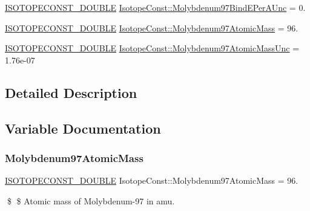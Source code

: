 \begin{DoxyCompactItemize}
\mbox{\hyperlink{group___isotope_const-_macros_ga8f45a7272ce02c0b4c65c44636ed719a}{I\+S\+O\+T\+O\+P\+E\+C\+O\+N\+S\+T\+\_\+\+D\+O\+U\+B\+LE}} \mbox{\hyperlink{group___isotope_const-_molybdenum-_mo97_gaccb187e931632cf61d34bbdfd971112c}{Isotope\+Const\+::\+Molybdenum97\+Bind\+E\+Per\+A\+Unc}} = 0.
\item 
\mbox{\hyperlink{group___isotope_const-_macros_ga8f45a7272ce02c0b4c65c44636ed719a}{I\+S\+O\+T\+O\+P\+E\+C\+O\+N\+S\+T\+\_\+\+D\+O\+U\+B\+LE}} \mbox{\hyperlink{group___isotope_const-_molybdenum-_mo97_ga2da184bc583d3535cd91ca4720f8041b}{Isotope\+Const\+::\+Molybdenum97\+Atomic\+Mass}} = 96.
\item 
\mbox{\hyperlink{group___isotope_const-_macros_ga8f45a7272ce02c0b4c65c44636ed719a}{I\+S\+O\+T\+O\+P\+E\+C\+O\+N\+S\+T\+\_\+\+D\+O\+U\+B\+LE}} \mbox{\hyperlink{group___isotope_const-_molybdenum-_mo97_ga3d53920f726c7496c94d31b7573a383a}{Isotope\+Const\+::\+Molybdenum97\+Atomic\+Mass\+Unc}} = 1.\+76e-\/07
\end{DoxyCompactItemize}


\subsection{Detailed Description}


\subsection{Variable Documentation}
\mbox{\label{group___isotope_const-_molybdenum-_mo97_ga2da184bc583d3535cd91ca4720f8041b}} 
\subsubsection{\texorpdfstring{Molybdenum97\+Atomic\+Mass}{Molybdenum97AtomicMass}}
{\footnotesize\ttfamily \mbox{\hyperlink{group___isotope_const-_macros_ga8f45a7272ce02c0b4c65c44636ed719a}{I\+S\+O\+T\+O\+P\+E\+C\+O\+N\+S\+T\+\_\+\+D\+O\+U\+B\+LE}} Isotope\+Const\+::\+Molybdenum97\+Atomic\+Mass = 96.}

\$ \$ Atomic mass of Molybdenum-\/97 in amu. \mbox{\label{group___isotope_const-_molybdenum-_mo97_ga3d53920f726c7496c94d31b7573a383a}} 
